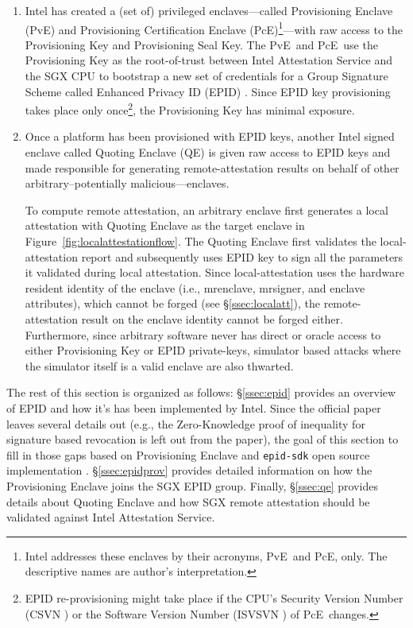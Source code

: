 \documentclass[letterpaper]{article}
\newcommand{\secref}[1]{\S\ref{#1}}
\newcommand{\mrenclave}{\textsf{mrenclave}}
\newcommand{\mrsigner}{\textsf{mrsigner}}
\newcommand{\pve}{\textsf{PvE}}
\newcommand{\pce}{\textsf{PcE}}
\newcommand{\qe}{\textsf{QE}}
\begin{document}
  \begin{enumerate}
    \item Intel has created a (set of) privileged enclaves---called
      \textsf{Provisioning Enclave} (\pve) and \textsf{Provisioning
        Certification Enclave} (\pce)\footnote{Intel addresses these
        enclaves by their acronyms, \pve\ and \pce, only. The
        descriptive names are author's interpretation.}---with raw
      access to the Provisioning Key and Provisioning Seal Key. The
      \pve\ and \pce\ use the Provisioning Key as the root-of-trust
      between Intel Attestation Service and the SGX CPU to bootstrap a
      new set of credentials for a Group Signature Scheme called
      Enhanced Privacy ID (EPID) \cite{epid}. Since EPID key
      provisioning takes place only once\footnote{EPID re-provisioning
        might take place if the CPU's Security Version Number (CSVN
        \cite[\S39.4.2.2]{intelsdm}) or the Software Version Number
        (ISVSVN \cite[\S39.4.2.1]{intelsdm}) of \pce\ changes.}, the
      Provisioning Key has minimal exposure.

    \item Once a platform has been provisioned with EPID keys, another
      Intel signed enclave called \textsf{Quoting Enclave} (\qe) is
      given raw access to EPID keys and made responsible for
      generating remote-attestation results on behalf of other
      arbitrary--potentially malicious---enclaves.

      To compute remote attestation, an arbitrary enclave first
      generates a local attestation with \textsf{Quoting Enclave} as
      the target enclave in Figure~\ref{fig:localattestationflow}. The
      \textsf{Quoting Enclave} first validates the local-attestation
      report and subsequently uses EPID key to sign all the parameters
      it validated during local attestation. Since local-attestation
      uses the hardware resident identity of the enclave (i.e.,
      \mrenclave, \mrsigner, and enclave attributes), which cannot be
      forged (see \secref{ssec:localatt}), the remote-attestation
      result on the enclave identity cannot be forged
      either. Furthermore, since arbitrary software never has direct
      or oracle access to either Provisioning Key or EPID
      private-keys, simulator based attacks where the simulator itself
      is a valid enclave are also thwarted.
  \end{enumerate}

  The rest of this section is organized as follows: \secref{ssec:epid}
  provides an overview of EPID and how it's has been implemented by
  Intel. Since the official \cite{epid} paper leaves several details
  out (e.g., the Zero-Knowledge proof of inequality for signature
  based revocation is left out from the paper), the goal of this
  section to fill in those gaps based on \textsf{Provisioning Enclave}
  and \texttt{epid-sdk} open source implementation
  \cite{epidsdk}. \secref{ssec:epidprov} provides detailed information
  on how the \textsf{Provisioning Enclave} joins the SGX EPID
  group. Finally, \secref{ssec:qe} provides details about
  \textsf{Quoting Enclave} and how SGX remote attestation should be
  validated against Intel Attestation Service.
\end{document}
